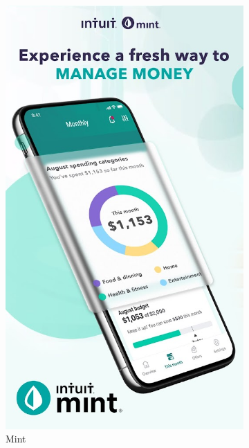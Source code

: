 \documentclass[shortabstract,inz]{iithesis}
\begin{document}
\begin{figure}[h]
\centering
\begin{subfigure}{0.45\textwidth}
    \includegraphics[width=\textwidth]{mint-screen.jpg}
    \caption{Mint}
    \label{fig:mint}
\end{subfigure}
\hfill
\begin{subfigure}{0.45\textwidth}

\end{subfigure}
\end{figure}
\end{document}
